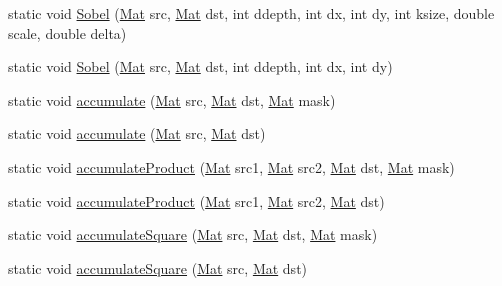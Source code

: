 \begin{DoxyCompactItemize}
\item 
static void \mbox{\hyperlink{classorg_1_1opencv_1_1imgproc_1_1_imgproc_aaec4c3ad19dcdf58835672462d7e1186}{Sobel}} (\mbox{\hyperlink{classorg_1_1opencv_1_1core_1_1_mat}{Mat}} src, \mbox{\hyperlink{classorg_1_1opencv_1_1core_1_1_mat}{Mat}} dst, int ddepth, int dx, int dy, int ksize, double scale, double delta)
\item 
static void \mbox{\hyperlink{classorg_1_1opencv_1_1imgproc_1_1_imgproc_ae4b25b52b9fa3942a6400c936cc2e683}{Sobel}} (\mbox{\hyperlink{classorg_1_1opencv_1_1core_1_1_mat}{Mat}} src, \mbox{\hyperlink{classorg_1_1opencv_1_1core_1_1_mat}{Mat}} dst, int ddepth, int dx, int dy)
\item 
static void \mbox{\hyperlink{classorg_1_1opencv_1_1imgproc_1_1_imgproc_a9258592f2447fc25785020eee8cc78f7}{accumulate}} (\mbox{\hyperlink{classorg_1_1opencv_1_1core_1_1_mat}{Mat}} src, \mbox{\hyperlink{classorg_1_1opencv_1_1core_1_1_mat}{Mat}} dst, \mbox{\hyperlink{classorg_1_1opencv_1_1core_1_1_mat}{Mat}} mask)
\item 
static void \mbox{\hyperlink{classorg_1_1opencv_1_1imgproc_1_1_imgproc_a63cfc78fd4e08d233d1f36d4609081ce}{accumulate}} (\mbox{\hyperlink{classorg_1_1opencv_1_1core_1_1_mat}{Mat}} src, \mbox{\hyperlink{classorg_1_1opencv_1_1core_1_1_mat}{Mat}} dst)
\item 
static void \mbox{\hyperlink{classorg_1_1opencv_1_1imgproc_1_1_imgproc_a1be426770d204691d4f181c5ed663f7a}{accumulate\+Product}} (\mbox{\hyperlink{classorg_1_1opencv_1_1core_1_1_mat}{Mat}} src1, \mbox{\hyperlink{classorg_1_1opencv_1_1core_1_1_mat}{Mat}} src2, \mbox{\hyperlink{classorg_1_1opencv_1_1core_1_1_mat}{Mat}} dst, \mbox{\hyperlink{classorg_1_1opencv_1_1core_1_1_mat}{Mat}} mask)
\item 
static void \mbox{\hyperlink{classorg_1_1opencv_1_1imgproc_1_1_imgproc_aa913bcb064a1079140398a6e7501df14}{accumulate\+Product}} (\mbox{\hyperlink{classorg_1_1opencv_1_1core_1_1_mat}{Mat}} src1, \mbox{\hyperlink{classorg_1_1opencv_1_1core_1_1_mat}{Mat}} src2, \mbox{\hyperlink{classorg_1_1opencv_1_1core_1_1_mat}{Mat}} dst)
\item 
static void \mbox{\hyperlink{classorg_1_1opencv_1_1imgproc_1_1_imgproc_a5de5a552dbd44bbc411de004bc11337b}{accumulate\+Square}} (\mbox{\hyperlink{classorg_1_1opencv_1_1core_1_1_mat}{Mat}} src, \mbox{\hyperlink{classorg_1_1opencv_1_1core_1_1_mat}{Mat}} dst, \mbox{\hyperlink{classorg_1_1opencv_1_1core_1_1_mat}{Mat}} mask)
\item 
static void \mbox{\hyperlink{classorg_1_1opencv_1_1imgproc_1_1_imgproc_ad364d805ad0822ebced2cfb163d6a095}{accumulate\+Square}} (\mbox{\hyperlink{classorg_1_1opencv_1_1core_1_1_mat}{Mat}} src, \mbox{\hyperlink{classorg_1_1opencv_1_1core_1_1_mat}{Mat}} dst)

\end{DoxyCompactItemize}
